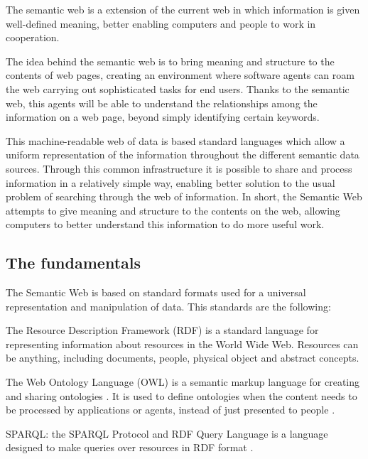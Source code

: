 The semantic web is a extension of the current web in which information is given well-defined meaning, better enabling computers and people to work in cooperation. \cite{berners2001semantic}

The idea behind the semantic web is to bring meaning and structure to the contents of web pages, creating an environment where software agents can roam the web carrying out sophisticated tasks for end users. Thanks to the semantic web, this agents will be able to understand the relationships among the information on a web page, beyond simply identifying certain keywords. 

This machine-readable web of data is based standard languages which allow a uniform representation of the information throughout the different semantic data sources. Through this common infrastructure it is possible to share and process information in a relatively simple way, enabling better solution to the usual problem of searching through the web of information. In short, the Semantic Web attempts to give meaning and structure to the contents on the web, allowing computers to better understand this information to do more useful work.

\subsection*{The fundamentals}

The Semantic Web is based on standard formats used for a universal representation and manipulation of data. This standards are the following:

\begin{description}
	\item[RDF:] The Resource Description Framework (RDF) is a standard language for representing information about resources in the World Wide Web. Resources can be anything, including documents, people, physical object and abstract concepts. \cite{rdfprimer10}
	
	\item[OWL:] The Web Ontology Language (OWL) is a semantic markup language for creating and sharing ontologies \cite{bechhofer2009owl}.  It is used to define ontologies when the content needs to be processed by applications or agents, instead of just presented to people \cite{mcguinness2004owl}. 

	\item{SPARQL:} the SPARQL Protocol and RDF Query Language is a language designed to make queries over resources in RDF format \cite{sparqlquery}. 
\end{description}

